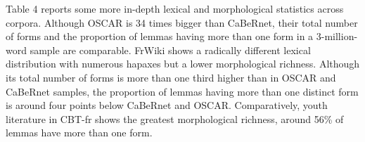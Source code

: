 Table 4 reports some more in-depth lexical and morphological statistics across corpora. Although OSCAR is 34 times bigger than CaBeRnet, their total number of forms and the proportion of lemmas having more than one form in a 3-million-word sample are comparable. FrWiki shows a radically different lexical distribution with numerous hapaxes but a lower morphological richness. Although its total number of forms is more than one third higher than in OSCAR and CaBeRnet samples, the proportion of lemmas having more than one distinct form is around four points below CaBeRnet and OSCAR. Comparatively, youth literature in CBT-fr shows the greatest morphological richness, around 56\% of lemmas have more than one form.








